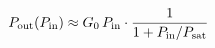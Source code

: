 \documentclass[preview]{standalone}
\begin{document}
\begin{align*}
\special{dvisvgm:raw <g id='unique000'>}P_{\rm out}(P_{\rm in}) \approx G_0\,P_{\rm in}\cdot\frac{1}{1 + P_{\rm in}/P_{\rm sat}}\special{dvisvgm:raw </g>}
\end{align*}
\end{document}
